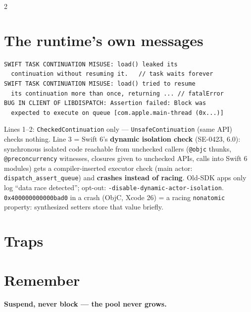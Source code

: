 \documentclass[8pt]{extarticle}
\begin{document}
\begin{multicols}{2}
\section{The runtime's own messages}
\begin{lstlisting}[style=plain]
SWIFT TASK CONTINUATION MISUSE: load() leaked its
  continuation without resuming it.   // task waits forever
SWIFT TASK CONTINUATION MISUSE: load() tried to resume
  its continuation more than once, returning ... // fatalError
BUG IN CLIENT OF LIBDISPATCH: Assertion failed: Block was
  expected to execute on queue [com.apple.main-thread (0x...)]
\end{lstlisting}
Lines 1–2: \texttt{CheckedContinuation} only — \texttt{UnsafeContinuation} (same API) checks nothing.
Line 3 = Swift 6's \textbf{dynamic isolation check} (SE-0423, 6.0): synchronous isolated code
reachable from unchecked callers (\texttt{@objc} thunks, \texttt{@preconcurrency} witnesses,
closures given to unchecked APIs, calls into Swift 6 modules) gets a compiler-inserted executor
check (main actor: \texttt{dispatch\_assert\_queue}) and \textbf{crashes instead of racing}.
Old-SDK apps only log ``data race detected''; opt-out: \texttt{-disable-dynamic-actor-isolation}.
\texttt{0x400000000000bad0} in a crash (ObjC, Xcode 26) = a racing \texttt{nonatomic} property:
synthesized setters store that value briefly.

\section{Traps}
\begin{itemize}
\end{itemize}

\section{Remember}
\textbf{Suspend, never block — the pool never grows.}


\end{multicols}

\end{document}

